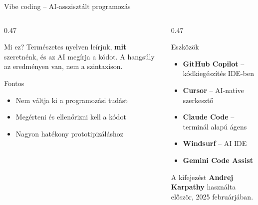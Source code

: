 \documentclass[aspectratio=169, 12pt]{beamer}
\begin{document}
\begin{frame}{Vibe coding -- AI-asszisztált programozás}
  \footnotesize
  \begin{columns}[T,onlytextwidth]
    \begin{column}{0.47\textwidth}
      \begin{block}{Mi ez?}
        Természetes nyelven leírjuk, \textbf{mit} szeretnénk, és az AI megírja a kódot. A hangsúly az eredményen van, nem a szintaxison.
      \end{block}

      \vspace{0.3cm}

      \begin{alertblock}{Fontos}
        \begin{itemize}\setlength{\itemsep}{1pt}
          \item Nem váltja ki a programozási tudást
          \item Megérteni és ellenőrizni kell a kódot
          \item Nagyon hatékony prototipizáláshoz
        \end{itemize}
      \end{alertblock}
    \end{column}
    \begin{column}{0.47\textwidth}
      \begin{exampleblock}{Eszközök}
        \begin{itemize}\setlength{\itemsep}{1pt}
          \item \textbf{GitHub Copilot} -- kódkiegészítés IDE-ben
          \item \textbf{Cursor} -- AI-native szerkesztő
          \item \textbf{Claude Code} -- terminál alapú ágens
          \item \textbf{Windsurf} -- AI IDE
          \item \textbf{Gemini Code Assist}
        \end{itemize}
      \end{exampleblock}

      \vspace{0.2cm}

      {\small A kifejezést \textbf{Andrej Karpathy} használta először, 2025 februárjában.}
    \end{column}
  \end{columns}
\end{frame}

\end{document}
